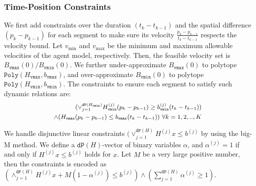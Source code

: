 \documentclass[letterpaper]{article} %
\theoremstyle{definition}
\begin{document}
\subsubsection{Time-Position Constraints}
We first add constraints over the duration $(t_k - t_{k-1})$ and the spatial difference $(p_k - p_{k-1})$ for each segment to make sure its velocity $\frac{p_k - p_{k-1}}{t_k - t_{k-1}}$ respects the velocity bound. 
Let $v_\text{min}$ and $v_\text{max}$ be the minimum and maximum allowable velocities of the agent model, respectively. Then, the feasible velocity set is $B_\texttt{vmax}(0) / B_\texttt{vmin}(0)$. We further under-approximate $B_\texttt{vmax}(0)$ to polytope $\texttt{Poly}(H_\texttt{vmax}, b_\texttt{vmax})$, and over-approximate $B_\texttt{vmin}(0)$ to polytope $\texttt{Poly}(H_\texttt{vmin}, b_\texttt{vmin})$. The constraints to ensure each segment to satisfy such dynamic relations are:
\begin{equation*}\small 
    \begin{aligned}
     (\lor_{j=1}^{\texttt{dP}(H_\texttt{vmin})} H_\texttt{vmin}^{(j)}(p_k - p_{k-1}) \geq   b_\texttt{vmin}^{(j)}(t_k - t_{k-1})) \\
    \land (H_\texttt{vmax}(p_k - p_{k-1}) \leq   b_\texttt{vmax}(t_k - t_{k-1}))\
    \forall k = 1,2,..,K
    \end{aligned}
\end{equation*}

We handle disjunctive linear constraints $(\lor_{j=1}^{\texttt{dP}(H)} H^{(j)} x \leq b^{(j)}$ by using the big-M method. We define a $\texttt{dP}(H)$-vector of binary variables $\alpha$, and $\alpha^{(j)} = 1$ if and only if $H^{(j)} x \leq b^{(j)}$ holds for $x$. Let $M$ be a very large positive number, then the constraints is encoded as %
         $(\land_{j=1}^{\texttt{dP}(H)} H^{(j)} x + M(1 - \alpha^{(j)}) \leq b^{(j)}) \land (\sum_{j=1}^{\texttt{dP}(H)} \alpha^{(j)} \geq 1)$.
\end{document}
